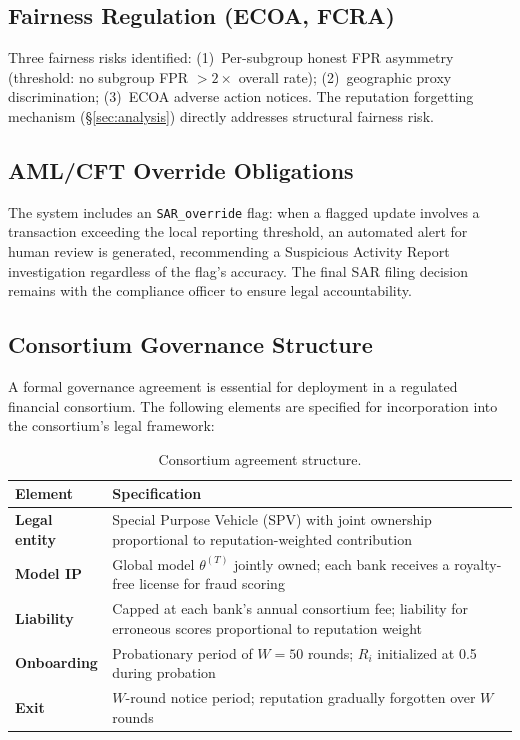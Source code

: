 \documentclass[10pt,journal]{IEEEtran}
\begin{document}
\subsection{Fairness Regulation (ECOA, FCRA)}

Three fairness risks identified: (1)~Per-subgroup honest FPR asymmetry (threshold: no subgroup FPR $> 2\times$ overall rate); (2)~geographic proxy discrimination; (3)~ECOA adverse action notices. The reputation forgetting mechanism (\S\ref{sec:analysis}) directly addresses structural fairness risk.

\subsection{AML/CFT Override Obligations}

The system includes an \texttt{SAR\_override} flag: when a flagged update involves a transaction exceeding the local reporting threshold, an automated alert for human review is generated, recommending a Suspicious Activity Report investigation regardless of the flag's accuracy. The final SAR filing decision remains with the compliance officer to ensure legal accountability.

\subsection{Consortium Governance Structure}\label{sec:governance}

A formal governance agreement is essential for deployment in a regulated financial consortium. The following elements are specified for incorporation into the consortium's legal framework:

\begin{table}[t]
\centering
\caption{Consortium agreement structure.}
\label{tab:governance}
\small
\begin{tabular}{lp{}}
\toprule
Element & Specification \\
\midrule
\textbf{Legal entity} & Special Purpose Vehicle (SPV) with joint ownership proportional to reputation-weighted contribution \\
\textbf{Model IP} & Global model $\theta^{(T)}$ jointly owned; each bank receives a royalty-free license for fraud scoring \\
\textbf{Liability} & Capped at each bank's annual consortium fee; liability for erroneous scores proportional to reputation weight \\
\textbf{Onboarding} & Probationary period of $W=50$ rounds; $R_i$ initialized at 0.5 during probation \\
\textbf{Exit} & $W$-round notice period; reputation gradually forgotten over $W$ rounds \\
\bottomrule
\end{tabular}
\end{table}
\end{document}

